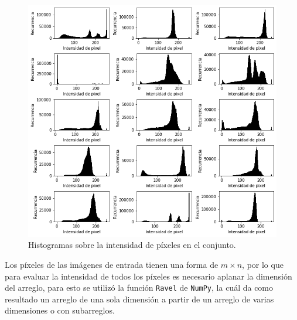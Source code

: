 \begin{figure}[]
    \centering
    \includegraphics[scale=0.65]{../Plots/threshold_input.png}
    \caption{Histogramas sobre la intensidad de píxeles en el conjunto.}
    \label{fig:hist_in}    
\end{figure}

Los píxeles de las imágenes de entrada tienen una forma de $m \times n$, por lo que para evaluar la intensidad de todos los píxeles es necesario aplanar la dimensión del arreglo, para esto se utilizó la función \texttt{Ravel} de \texttt{NumPy}, la cuál da como resultado un arreglo de una sola dimensión a partir de un arreglo de varias dimensiones o con subarreglos.



